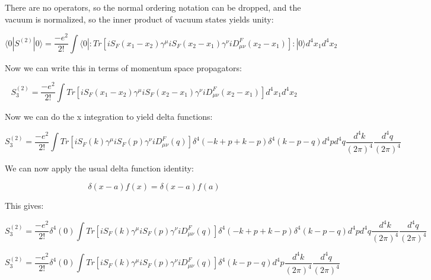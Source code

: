 \documentclass[a4]{article}
\begin{document}
        \begin{framed}

            There are no operators, so the normal ordering notation can be dropped, and the vacuum is normalized, so the inner product of vacuum states yields unity:

            \begin{equation}
                \langle 0 | S^{(2)} | 0 \rangle = \frac{- e^2}{2!} \int \langle 0 |: Tr [i S_{F} (x_1 - x_2) \gamma^{\mu} i S_{F} (x_2 - x_1) \gamma^{\nu} i D_{\mu \nu}^{F} (x_2 - x_1)] :| 0 \rangle d^{4} x_1 d^{4} x_2
            \end{equation}

            Now we can write this in terms of momentum space propagators:

            \begin{equation}
                S^{(2)}_3 = \frac{- e^2}{2!} \int Tr [i S_{F} (x_1 - x_2) \gamma^{\mu} i S_{F} (x_2 - x_1) \gamma^{\nu} i D_{\mu \nu}^{F} (x_2 - x_1)] d^{4} x_1 d^{4} x_2 
            \end{equation}

            Now we can do the x integration to yield delta functions:

            \begin{equation}
                S^{(2)}_3 = \frac{- e^2}{2!} \int Tr [i S_{F} (k) \gamma^{\mu} i S_{F} (p) \gamma^{\nu} i D_{\mu \nu}^{F} (q)] \delta^{4} (- k + p + k - p) \delta^{4} (k - p - q) d^{4} p d^{4} q \frac{d^4 k}{(2 \pi)^4} \frac{d^4 q}{(2 \pi)^4}
            \end{equation}

            We can now apply the usual delta function identity:

            \begin{equation}
                \delta (x - a) f (x) = \delta (x - a) f(a)
            \end{equation}

            This gives:

            \begin{equation}
                S^{(2)}_3 = \frac{- e^2}{2!} \delta^{4} (0) \int Tr [i S_{F} (k) \gamma^{\mu} i S_{F} (p) \gamma^{\nu} i D_{\mu \nu}^{F} (q)] \delta^{4} (- k + p + k - p) \delta^{4} (k - p - q) d^{4} p d^{4} q \frac{d^4 k}{(2 \pi)^4} \frac{d^4 q}{(2 \pi)^4}
            \end{equation}

            \begin{equation}
                S^{(2)}_3 = \frac{- e^2}{2!} \delta^{4} (0) \int Tr [i S_{F} (k) \gamma^{\mu} i S_{F} (p) \gamma^{\nu} i D_{\mu \nu}^{F} (q)] \delta^{4} (k - p - q) d^{4} p \frac{d^4 k}{(2 \pi)^4} \frac{d^4 q}{(2 \pi)^4}
            \end{equation}


\end{framed}
\end{document}
